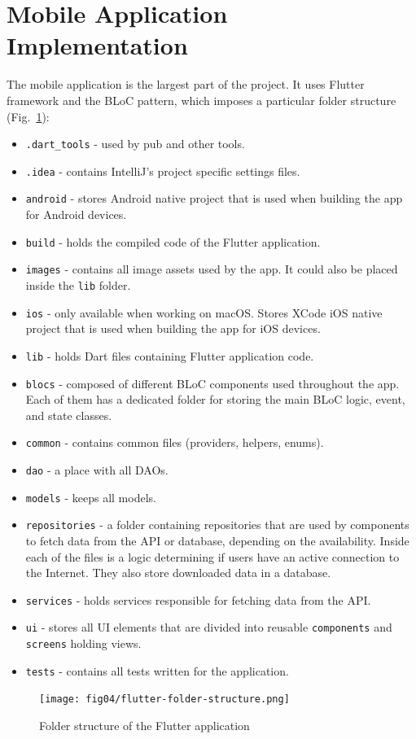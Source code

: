\section{Mobile Application Implementation}
The mobile application is the largest part of the project. It uses Flutter framework and the BLoC pattern, which imposes a particular folder structure (Fig.~\ref{fig:flutter-folder-structure}):
\begin{itemize}
    \item \texttt{.dart\_tools} - used by pub and other tools.
    \item \texttt{.idea} - contains IntelliJ’s project specific settings files.
    \item \texttt{android} - stores Android native project that is used when building the app for Android devices.
    \item \texttt{build} - holds the compiled code of the Flutter application.
    \item \texttt{images} - contains all image assets used by the app. It could also be placed inside the \texttt{lib} folder.
    \item \texttt{ios} - only available when working on macOS. Stores XCode iOS native project that is used when building the app for iOS devices.
    \item \texttt{lib} - holds Dart files containing Flutter application code.
    \item \texttt{blocs} - composed of different BLoC components used throughout the app. Each of them has a dedicated folder for storing the main BLoC logic, event, and state classes.
    \item \texttt{common} - contains common files (providers, helpers, enums).
    \item \texttt{dao} - a place with all DAOs.
    \item \texttt{models} - keeps all models.
    \item \texttt{repositories} - a folder containing repositories that are used by components to fetch data from the API or database, depending on the availability. Inside each of the files is a logic determining if users have an active connection to the Internet. They also store downloaded data in a database.
    \item \texttt{services} - holds services responsible for fetching data from the API.
    \item \texttt{ui} - stores all UI elements that are divided into reusable \texttt{components} and \texttt{screens} holding views.
    \item \texttt{tests} - contains all tests written for the application.
\end{itemize}
\begin{figure}[t]
    \centering
    \texttt{[image: fig04/flutter-folder-structure.png]}
    \caption{Folder structure of the Flutter application}
    \label{fig:flutter-folder-structure}
\end{figure}

